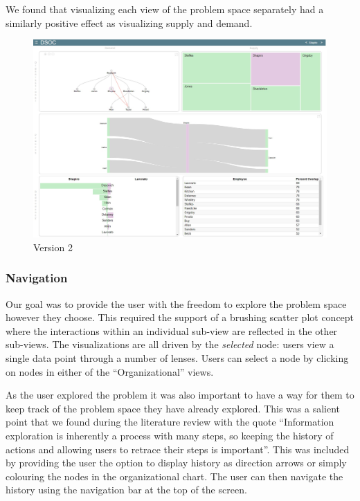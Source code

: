 \documentclass[journal]{vgtc}                %
\begin{document}
We found that visualizing each view of the problem space separately had a similarly positive effect as visualizing supply and demand. 

\begin{figure}
	\centering
	\includegraphics[width=\columnwidth]{pictures/version2.jpg}
	\caption{Version 2}
	\label{fig:version2}
\end{figure}

\subsubsection{Navigation}

Our goal was to provide the user with the freedom to explore the problem space however they choose.  This required the support of a brushing scatter plot concept where the interactions within an individual sub-view are reflected in the other sub-views. The visualizations are all driven by the \emph{selected} node: users view a single data point through a number of lenses. Users can select a node by clicking on nodes in either of the ``Organizational'' views. 

As the user explored the problem it was also important to have a way for them to keep track of the problem space they have already explored.  This was a salient point that we found during the literature review with the quote ``Information exploration is inherently a process with many steps, so keeping the history of actions and allowing users to retrace their steps is important''\cite{anafigueiras}.  This was included by providing the user the option to display history as direction arrows or simply colouring the nodes in the organizational chart.  The user can then navigate the history using the navigation bar at the top of the screen.
\end{document}
